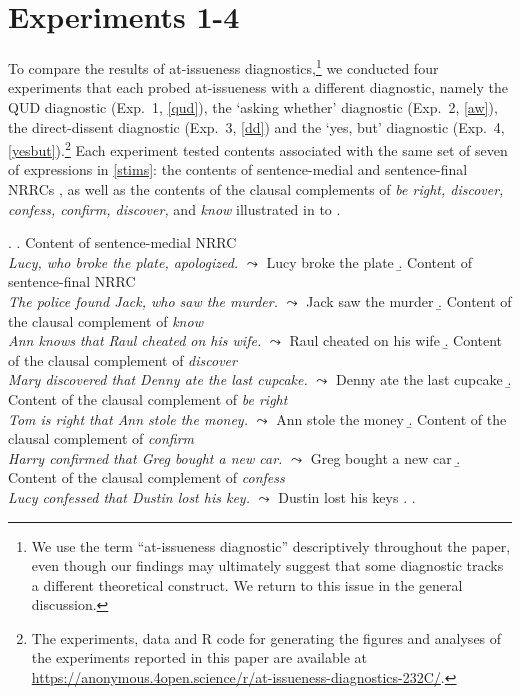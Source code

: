\documentclass[times,linguex]{glossa}
\begin{document}
\section{Experiments 1-4 \label{sec:2_experiments}}
To compare the results of at-issueness diagnostics,\footnote{We use the term \enquote{at-issueness diagnostic} descriptively throughout the paper, even though our findings may ultimately suggest that some diagnostic tracks a different theoretical construct. We return to this issue in the general discussion.} we conducted four experiments that each probed at-issueness with a different diagnostic, namely the QUD diagnostic (Exp.~1, \ref{qud}), the `asking whether' diagnostic (Exp.~2, \ref{aw}), the direct-dissent diagnostic (Exp.~3, \ref{dd}) and the `yes, but' diagnostic (Exp.~4, \ref{yesbut}).\footnote{The experiments, data and R code for generating the figures and analyses of the experiments reported in this paper are available at \url{https://anonymous.4open.science/r/at-issueness-diagnostics-232C/}.}
Each experiment tested contents associated with the same set of seven of expressions in \ref{stims}: the contents of sentence-medial and sentence-final NRRCs \Next[a--b], as well as the contents of the clausal complements of \emph{be right, discover, confess, confirm, discover,} and \emph{know} illustrated in \Next[c] to \Next[g].

\ex.\label{stims}
\a.\label{stims.a} Content of sentence-medial NRRC \\
\emph{Lucy, who broke the plate, apologized.} $\leadsto$ Lucy broke the plate\smallskip
\b.\label{stims.b} Content of sentence-final NRRC \\
\emph{The police found Jack, who saw the murder.} $\leadsto$ Jack saw the murder\smallskip
\b.\label{stims.c} Content of the clausal complement of \emph{know} \\
\emph{Ann knows that Raul cheated on his wife.} $\leadsto$ Raul cheated on his wife\smallskip
\b.\label{stims.d} Content of the clausal complement of \emph{discover} \\
\emph{Mary discovered that Denny ate the last cupcake.} $\leadsto$ Denny ate the last cupcake\smallskip
\b.\label{stims.e} Content of the clausal complement of \emph{be right} \\
\emph{Tom is right that Ann stole the money.} $\leadsto$ Ann stole the money\smallskip
\b.\label{stims.f} Content of the clausal complement of \emph{confirm} \\
\emph{Harry confirmed that Greg bought a new car.} $\leadsto$ Greg bought a new car\smallskip
\b.\label{stims.g} Content of the clausal complement of \emph{confess}  \\
\emph{Lucy confessed that Dustin lost his key.} $\leadsto$ Dustin lost his keys
\z.
\z.
\end{document}
